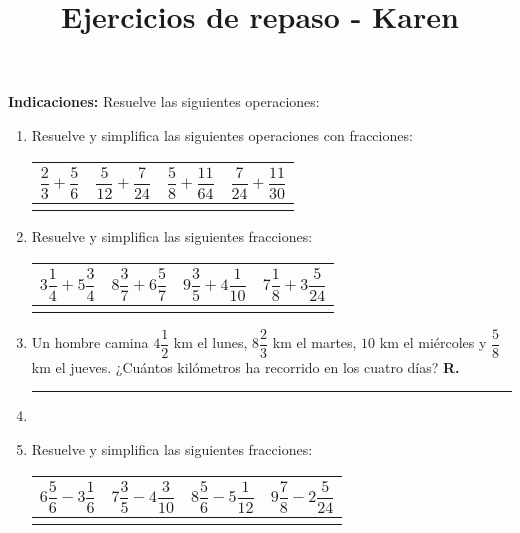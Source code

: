 

\title{Ejercicios de repaso - Karen \vspace{-2cm}}
\author{}
\date{ }



\maketitle
\fontsize{14}{14}\selectfont

\textbf{Indicaciones: } Resuelve las siguientes operaciones:

\begin{enumerate}[label=\roman*)]
\item Resuelve y simplifica las siguientes operaciones con fracciones:
\begin{table}[H]
\centering
\def\arraystretch{2}
\setlength{\tabcolsep}{18pt}
\begin{tabular}{ | c | c | c | c | } 
\hline
$\dfrac{2}{3} + \dfrac{5}{6}$ & $\dfrac{5}{12} + \dfrac{7}{24}$ & $\dfrac{5}{8} + \dfrac{11}{64}$ & $\dfrac{7}{24} + \dfrac{11}{30}$ \\ \hline
 & & &  \\ \hline  
\end{tabular}
\end{table}
\item Resuelve y simplifica las siguientes fracciones:
\begin{table}[H]
\centering
\def\arraystretch{2}
\setlength{\tabcolsep}{18pt}
\begin{tabular}{ | c | c | c | c | } 
\hline
$3 \dfrac{1}{4} + 5 \dfrac{3}{4}$ & $8 \dfrac{3}{7} + 6 \dfrac{5}{7}$ & $9 \dfrac{3}{5} + 4 \dfrac{1}{10}$ & $7 \dfrac{1}{8} + 3 \dfrac{5}{24}$ \\ \hline
 & & & \\ \hline  
\end{tabular}
\end{table}
\item Un hombre camina $4 \dfrac{1}{2}$ km el lunes, $8 \dfrac{2}{3}$ km el martes, $10$ km el miércoles y $\dfrac{5}{8}$ km el jueves. ¿Cuántos kilómetros ha recorrido en los cuatro días? \hspace{0.3cm} \textbf{R.} \rule{3cm}{0.1mm}
\item \item Resuelve y simplifica las siguientes fracciones:
\begin{table}[H]
\centering
\def\arraystretch{2}
\setlength{\tabcolsep}{18pt}
\begin{tabular}{ | c | c | c | c | } 
\hline
$6 \dfrac{5}{6} - 3 \dfrac{1}{6}$ & $7 \dfrac{3}{5} - 4 \dfrac{3}{10}$ & $8 \dfrac{5}{6} - 5 \dfrac{1}{12}$ & $9 \dfrac{7}{8} - 2\dfrac{5}{24}$ \\ \hline
 & & & \\ \hline  
\end{tabular}
\end{table}
\end{enumerate}


